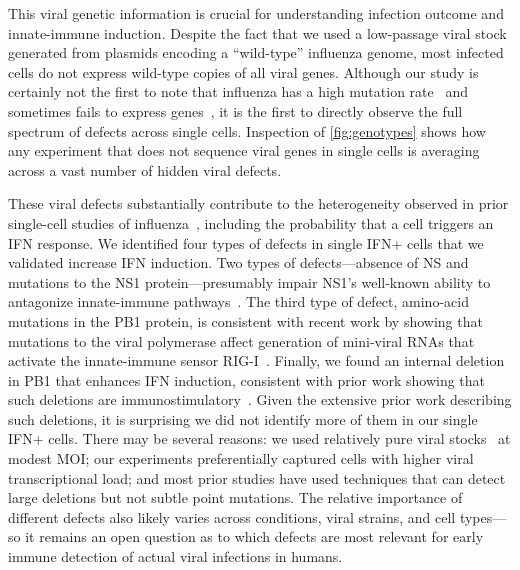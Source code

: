 \documentclass[10pt,letterpaper]{article}
\newcommand{\FIG}[1]{\autoref{fig:#1}}
\begin{document}
This viral genetic information is crucial for understanding infection outcome and innate-immune induction.
Despite the fact that we used a low-passage viral stock generated from plasmids encoding a ``wild-type'' influenza genome, most infected cells do not express wild-type copies of all viral genes.
Although our study is certainly not the first to note that influenza has a high mutation rate~\citep{parvin1986measurement, suarez1992heterogeneity, bloom2014experimentally, pauly2017novel} and sometimes fails to express genes~\citep{brooke2013most, heldt2015single, dou2017analysis, russell2018extreme}, it is the first to directly observe the full spectrum of defects across single cells.
Inspection of \FIG{genotypes} shows how any experiment that does not sequence viral genes in single cells is averaging across a vast number of hidden viral defects.

These viral defects substantially contribute to the heterogeneity observed in prior single-cell studies of influenza~\citep{russell2018extreme, steuerman2018dissection, heldt2015single, sjaastad2018distinct}, including the probability that a cell triggers an IFN response.
We identified four types of defects in single IFN+ cells that we validated increase IFN induction. 
Two types of defects---absence of NS and mutations to the NS1 protein---presumably impair NS1's well-known ability to antagonize innate-immune pathways~\citep{garcia1998influenza, hale2008multifunctional}.
The third type of defect, amino-acid mutations in the PB1 protein, is consistent with recent work by showing that mutations to the viral polymerase affect generation of mini-viral RNAs that activate the innate-immune sensor RIG-I~\citep{velthuis2018mini}.
Finally, we found an internal deletion in PB1 that enhances IFN induction, consistent with prior work showing that such deletions are immunostimulatory~\citep{baum2010preference, tapia2013defective, boergeling2015evidence, dimmock2015cloned}.
Given the extensive prior work describing such deletions, it is surprising we did not identify more of them in our single IFN+ cells.
There may be several reasons: we used relatively pure viral stocks~\citep{xue2016propagation} at modest MOI; our experiments preferentially captured cells with higher viral transcriptional load; and most prior studies have used techniques that can detect large deletions but not subtle point mutations.
The relative importance of different defects also likely varies across conditions, viral strains, and cell types---so it remains an open question as to which defects are most relevant for early immune detection of actual viral infections in humans.
\end{document}
